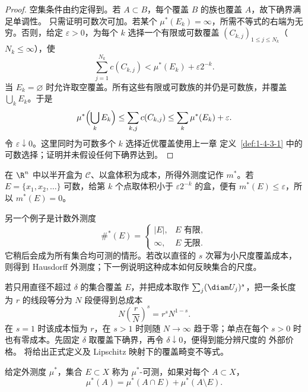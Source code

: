 \begin{proof}
空集条件由约定得到。若 $A\subset B$，每个覆盖 $B$ 的族也覆盖 $A$，故下确界满足单调性。
只需证明可数次可加。若某个 $\mu^*(E_k)=\infty$，所需不等式的右端为无穷。否则，给定
$\varepsilon>0$，为每个 $k$ 选择一个有限或可数覆盖
$(C_{k,j})_{1\le j\le N_k}$（$N_k\le\infty$），使
\[
 \sum_{j=1}^{N_k}c(C_{k,j})<\mu^*(E_k)+\varepsilon2^{-k}.
\]
当 $E_k=\varnothing$ 时允许取空覆盖。所有这些有限或可数族的并仍是可数族，并覆盖
$\bigcup_kE_k$。于是
\[
 \mu^*\Bigl(\bigcup_kE_k\Bigr)
 \le\sum_{k,j}c(C_{k,j})
 \le\sum_k\mu^*(E_k)+\varepsilon.
\]
令 $\varepsilon\downarrow0$。这里同时为可数多个 $k$ 选择近优覆盖使用上一章
定义~\ref{def:1-4-3-1} 中的可数选择；证明并未假设任何下确界达到。
\end{proof}

\begin{example}[三种外部价格]\label{ex:2-1-2-1}
在 $\R^n$ 中以半开盒为 $\mathcal C$、以盒体积为成本，所得外测度记作 $m^*$。若
$E=\{x_1,x_2,\dots\}$ 可数，给第 $k$ 个点取体积小于 $\varepsilon2^{-k}$ 的盒，便有
$m^*(E)\le\varepsilon$，所以 $m^*(E)=0$。

另一个例子是计数外测度
\[
 \#^*(E)=\begin{cases}|E|,&E\text{ 有限},\\ \infty,&E\text{ 无限}.
 \end{cases}
\]
它稍后会成为所有集合均可测的情形。若改以直径的 $s$ 次幂为小尺度覆盖成本，则得到
Hausdorff 外测度；下一例说明这种成本如何反映集合的尺度。
\end{example}

\begin{example}\label{ex:2-1-2-2}
若只用直径不超过 $\delta$ 的集合覆盖 $E$，并把成本取作
$\sum_j(\diam U_j)^s$，把一条长度为 \(r\) 的线段等分为 \(N\) 段便得到总成本
\[
 N\left(\frac rN\right)^s=r^sN^{1-s}.
\]
在 \(s=1\) 时该成本恒为 \(r\)，在 \(s>1\) 时则随 \(N\to\infty\) 趋于零；单点在每个
\(s>0\) 时也有零成本。先固定 $\delta$ 取覆盖下确界，再令 $\delta\downarrow0$，便得到能分辨尺度的
外部价格。 将给出正式定义及 Lipschitz 映射下的覆盖畸变不等式。
\end{example}

\begin{definition}[\Caratheodory{} 可测]\label{def:2-1-2-2}
给定外测度 $\mu^*$，集合 $E\subset X$ 称为 $\mu^*$-可测，如果对每个 $A\subset X$，
\[
 \mu^*(A)=\mu^*(A\cap E)+\mu^*(A\setminus E).
 \label{eq:caratheodory-cut}
\]
\end{definition}

